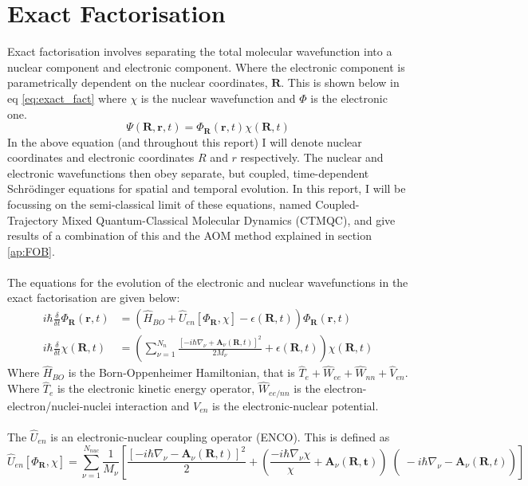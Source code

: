 \section{Exact Factorisation}
Exact factorisation \cite{abedi_exact_2010} involves separating the total molecular wavefunction into a nuclear component and electronic component. Where the electronic component is parametrically dependent on the nuclear coordinates, $\mathbf{R}$. This is shown below in eq \eqref{eq:exact_fact} where $\chi$ is the nuclear wavefunction and $\Phi$ is the electronic one.
\begin{equation}
 \Psi(\mathbf{R}, \mathbf{r}, t) = \Phi_{\mathbf{R}}(\mathbf{r}, t) \chi(\mathbf{R}, t)
 \label{eq:exact_fact}
 \end{equation}
In the above equation (and throughout this report) I will denote nuclear coordinates and electronic coordinates $R$ and $r$ respectively. The nuclear and electronic wavefunctions then obey separate, but coupled, time-dependent Schr\"odinger equations for spatial and temporal evolution. In this report, I will be focussing on the semi-classical limit of these equations, named Coupled-Trajectory Mixed Quantum-Classical Molecular Dynamics (CTMQC), and give results of a combination of this and the AOM method explained in section \ref{ap:FOB}.
\\\\
The equations for the evolution of the electronic and nuclear wavefunctions in the exact factorisation \cite{abedi_exact_2010} are given below:
\begin{align}
  i\hbar \frac{\delta}{\delta t} \Phi_{\mathbf{R}}(\mathbf{r}, t) &= \left( \hat{H}_{BO} + \hat{U}_{en}\left[ \Phi_{\mathbf{R}}, \chi\right] - \epsilon(\mathbf{R}, t) \right) \Phi_{\mathbf{R}} (\mathbf{r}, t)
  \label{eq:electronic_exact}
\\
i\hbar \frac{\delta}{\delta t} \chi (\mathbf{R}, t) &= \left( \sum_{\nu = 1}^{N_{n}} \frac{[-i\hbar\nabla_{\nu} + \mathbf{A}_{\nu}(\mathbf{R}, t)]^2}{2 M_{\nu}} + \epsilon(\mathbf{R}, t)\right) \chi (\mathbf{R}, t)
  \label{eq:nuclear_exact}
\end{align}
Where $\hat{H}_{BO}$ is the Born-Oppenheimer Hamiltonian, that is $\hat{T}_{e} + \hat{W}_{ee} + \hat{W}_{nn} + \hat{V}_{en}$. Where $\hat{T}_{e}$ is the electronic kinetic energy operator, $\hat{W}_{ee/nn}$ is the electron-electron/nuclei-nuclei interaction and $V_{en}$ is the electronic-nuclear potential.
\\\\
The $\hat{U}_{en}$ is an electronic-nuclear coupling operator (ENCO). This is defined as \begin{equation}
  \hat{U}_{en}[\Phi_{\mathbf{R}}, \chi] = \sum_{\nu=1}^{N_{nuc}} \frac{1}{M_{\nu}} \left[ \frac{\left[-i \hbar \nabla_{\nu} - \mathbf{A}_{\nu}(\mathbf{R}, t) \right]^2}{2} + \left( \left. \left. \frac{-i\hbar \nabla_{\nu} \chi}{\chi} + \mathbf{A}_{\nu}(\mathbf{R, t})\right)\right( -i\hbar\nabla_{\nu} -            \mathbf{A}_{\nu}(\mathbf{R}, t)\right) \right]
  \label{eq:ENCO}
\end{equation}
